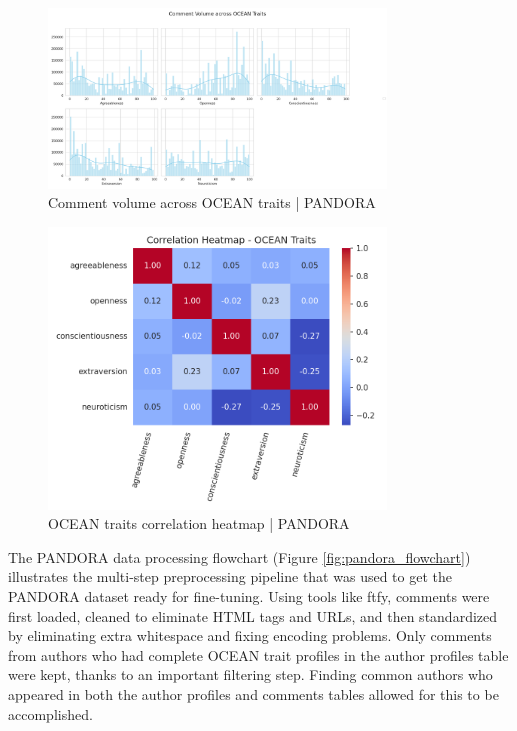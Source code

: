 \documentclass{DESSThesis}
\begin{document}
\begin{figure}[H]
    \centering
    \includegraphics[width=0.8\textwidth]{img/data_eda/2_comment_volume_vs_trait.png}
    \caption{Comment volume across OCEAN traits | PANDORA}
    \label{fig:comment_vol_ocean_pandora}
\end{figure}

\begin{figure}[H]
    \centering
    \includegraphics[width=0.8\textwidth]{img/data_eda/3_ocean_trait_correlation.png}
    \caption{OCEAN traits correlation heatmap | PANDORA}
    \label{fig:ocean_trait_correlation_pandora}
\end{figure}

The PANDORA data processing flowchart (Figure \ref{fig:pandora_flowchart}) illustrates the multi-step preprocessing pipeline that was used to get the PANDORA dataset ready for fine-tuning. Using tools like ftfy, comments were first loaded, cleaned to eliminate HTML tags and URLs, and then standardized by eliminating extra whitespace and fixing encoding problems. Only comments from authors who had complete OCEAN trait profiles in the author profiles table were kept, thanks to an important filtering step. Finding common authors who appeared in both the author profiles and comments tables allowed for this to be accomplished.
\end{document}
